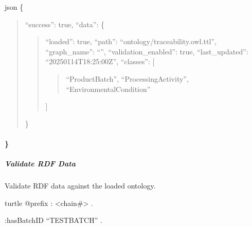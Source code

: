 \documentclass[letterpaper,10pt,english]{sphinxmanual}
\begin{document}
\sphinxAtStartPar
{}
{\color{red}\bfseries{}\textasciigrave{}\textasciigrave{}}{\color{red}\bfseries{}\textasciigrave{}}json
\{
\begin{quote}

\sphinxAtStartPar
“success”: true,
“data”: \{
\begin{quote}

\sphinxAtStartPar
“loaded”: true,
“path”: “ontology/traceability.owl.ttl”,
“graph\_name”: “”,
“validation\_enabled”: true,
“last\_updated”: “2025\sphinxhyphen{}01\sphinxhyphen{}14T18:25:00Z”,
“classes”: {[}
\begin{quote}

\sphinxAtStartPar
“ProductBatch”,
“ProcessingActivity”,
“EnvironmentalCondition”
\end{quote}

\sphinxAtStartPar
{]}
\end{quote}

\sphinxAtStartPar
\}
\end{quote}


\paragraph{\}}
\label{\detokenize{api/rest-api:id66}}

\subparagraph{Validate RDF Data}
\label{\detokenize{api/rest-api:validate-rdf-data}}
\sphinxAtStartPar
Validate RDF data against the loaded ontology.

\sphinxAtStartPar
{} 

\sphinxAtStartPar
{}

\sphinxAtStartPar
{}
{\color{red}\bfseries{}\textasciigrave{}\textasciigrave{}}{\color{red}\bfseries{}\textasciigrave{}}turtle
@prefix : \textless{}\sphinxhyphen{}chain\#\textgreater{} .
\begin{description}
\sphinxAtStartPar
:hasBatchID “TEST\sphinxhyphen{}BATCH” .

\end{description}

\sphinxAtStartPar
{\color{red}\bfseries{}\textasciigrave{}\textasciigrave{}}{\color{red}\bfseries{}\textasciigrave{}}
\end{document}
